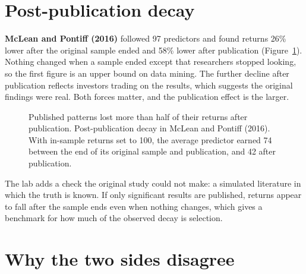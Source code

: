 \section{Post-publication decay}
\label{sec:19-decay}

\textbf{McLean and Pontiff (2016)} followed 97 predictors and found returns 26\% lower after the original sample ended and 58\% lower after publication (Figure~\ref{fig:19-decay}). Nothing changed when a sample ended except that researchers stopped looking, so the first figure is an upper bound on data mining. The further decline after publication reflects investors trading on the results, which suggests the original findings were real. Both forces matter, and the publication effect is the larger.

\begin{figure}[htbp]
\centering
{}
\caption{Published patterns lost more than half of their returns after publication. Post-publication decay in McLean and Pontiff (2016). With in-sample returns set to 100, the average predictor earned 74 between the end of its original sample and publication, and 42 after publication.}
\label{fig:19-decay}
\end{figure}

The lab adds a check the original study could not make: a simulated literature in which the truth is known. If only significant results are published, returns appear to fall after the sample ends even when nothing changes, which gives a benchmark for how much of the observed decay is selection.

\section{Why the two sides disagree}
\label{sec:19-why}

